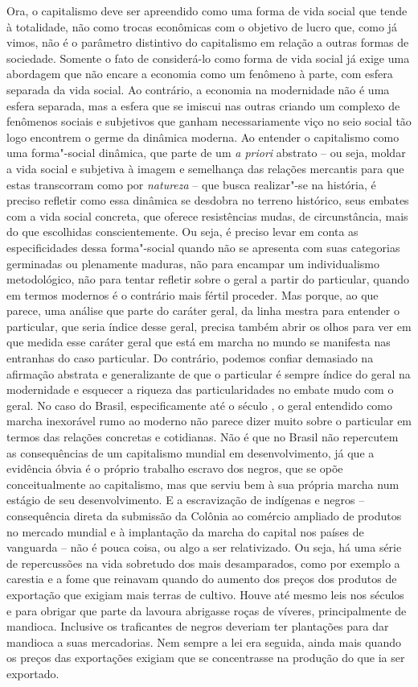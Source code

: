 Ora, o capitalismo deve ser apreendido como uma forma de vida social que
tende à totalidade, não como trocas econômicas com o objetivo de lucro
que, como já vimos, não é o parâmetro distintivo do capitalismo em
relação a outras formas de sociedade. Somente o fato de considerá-lo
como forma de vida social já exige uma abordagem que não encare a
economia como um fenômeno à parte, com esfera separada da vida social.
Ao contrário, a economia na modernidade não é uma esfera separada, mas a
esfera que se imiscui nas outras criando um complexo de fenômenos
sociais e subjetivos que ganham necessariamente viço no seio social tão
logo encontrem o germe da dinâmica moderna. Ao entender o capitalismo
como uma forma"-social dinâmica, que parte de um \emph{a priori} abstrato
-- ou seja, moldar a vida social e subjetiva à imagem e semelhança das
relações mercantis para que estas transcorram como por \emph{natureza}
-- que busca realizar"-se na história, é preciso refletir como essa
dinâmica se desdobra no terreno histórico, seus embates com a vida
social concreta, que oferece resistências mudas, de circunstância, mais
do que escolhidas conscientemente. Ou seja, é preciso levar em conta as
especificidades dessa forma"-social quando não se apresenta com suas
categorias germinadas ou plenamente maduras, não para encampar um
individualismo metodológico, não para tentar refletir sobre o geral a
partir do particular, quando em termos modernos é o contrário mais
fértil proceder. Mas porque, ao que parece, uma análise que parte do
caráter geral, da linha mestra para entender o particular, que seria
índice desse geral, precisa também abrir os olhos para ver em que medida
esse caráter geral que está em marcha no mundo se manifesta nas
entranhas do caso particular. Do contrário, podemos confiar demasiado na afirmação
abstrata e generalizante de que o particular é sempre índice do geral na
modernidade e esquecer a riqueza das particularidades no embate mudo com
o geral. No caso do Brasil, especificamente até o século , o geral
entendido como marcha inexorável rumo ao moderno não parece dizer muito
sobre o particular em termos das relações concretas e cotidianas. Não é
que no Brasil não repercutem as consequências de um capitalismo mundial
em desenvolvimento, já que a evidência óbvia é o próprio trabalho
escravo dos negros, que se opõe conceitualmente ao capitalismo, mas que
serviu bem à sua própria marcha num estágio de seu desenvolvimento. E a
escravização de indígenas e negros -- consequência direta da submissão
da Colônia ao comércio ampliado de produtos no mercado mundial e à
implantação da marcha do capital nos países de vanguarda -- não é pouca
coisa, ou algo a ser relativizado. Ou seja, há uma série de repercussões
na vida sobretudo dos mais desamparados, como por exemplo a carestia e a
fome que reinavam quando do aumento dos preços dos produtos de
exportação que exigiam mais terras de cultivo. Houve até mesmo leis nos
séculos  e  para obrigar que parte da lavoura abrigasse roças
de víveres, principalmente de mandioca. Inclusive os traficantes de
negros deveriam ter plantações para dar mandioca a suas mercadorias. Nem
sempre a lei era seguida, ainda mais quando os preços das exportações
exigiam que se concentrasse na produção do que ia ser exportado.

